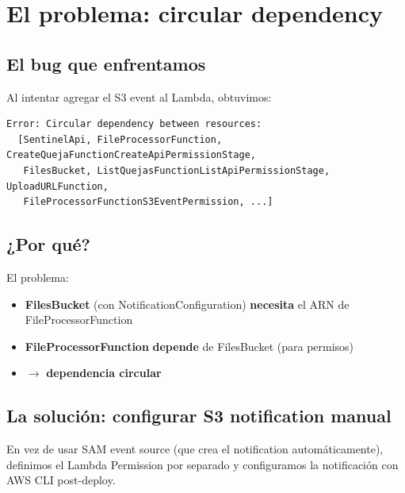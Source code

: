 \documentclass[11pt,a4paper,oneside]{article}
\begin{document}
\section{El problema: circular dependency}

\subsection{El bug que enfrentamos}

Al intentar agregar el S3 event al Lambda, obtuvimos:

\begin{lstlisting}
Error: Circular dependency between resources:
  [SentinelApi, FileProcessorFunction, CreateQuejaFunctionCreateApiPermissionStage,
   FilesBucket, ListQuejasFunctionListApiPermissionStage, UploadURLFunction,
   FileProcessorFunctionS3EventPermission, ...]
\end{lstlisting}

\subsection{¿Por qu\'e?}

El problema:
\begin{itemize}
  \item \textbf{FilesBucket} (con NotificationConfiguration) \textbf{necesita} el ARN de FileProcessorFunction
  \item \textbf{FileProcessorFunction} \textbf{depende} de FilesBucket (para permisos)
  \item $\rightarrow$ \textbf{dependencia circular}
\end{itemize}

\subsection{La soluci\'on: configurar S3 notification manual}

En vez de usar SAM event source (que crea el notification autom\'aticamente), definimos el Lambda Permission por separado y configuramos la notificaci\'on con AWS CLI post-deploy.
\end{document}
